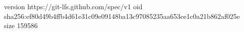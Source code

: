 version https://git-lfs.github.com/spec/v1
oid sha256:ef80d49b4ffb4d61e31c09e09148ba13c97085235aa653ce1c0a21b862af025e
size 159586
